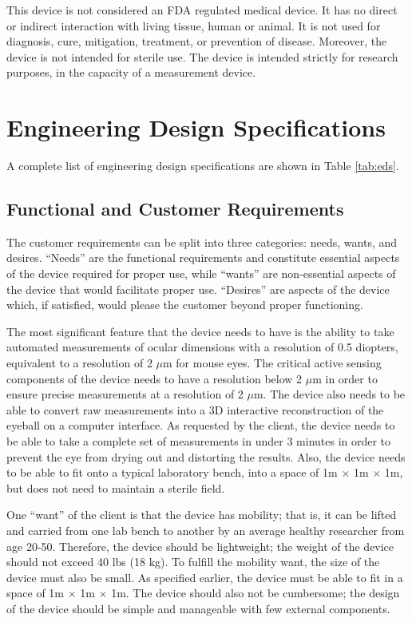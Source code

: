 \documentclass{article}
\begin{document}
This device is not considered an FDA regulated medical device. It has
no direct or indirect interaction with living tissue, human or
animal. It is not used for diagnosis, cure, mitigation, treatment, or
prevention of disease. Moreover, the device is not intended for
sterile use. The device is intended strictly for research
purposes, in the capacity of a measurement device.

\section{Engineering Design Specifications}
A complete list of engineering design specifications are shown in Table \ref{tab:eds}.

\subsection{Functional and Customer Requirements}
The customer requirements can be split into three categories: needs, wants, and desires. ``Needs'' are the functional requirements and constitute essential aspects of the device required for proper use, while ``wants'' are non‐essential aspects of the device that would facilitate proper use. ``Desires'' are aspects of the device which, if satisfied, would please the customer beyond proper functioning.  

The most significant feature that the device needs to have is the
ability to take automated measurements of ocular dimensions with a
resolution of 0.5 diopters, equivalent to a resolution of 2 $\mu$m for
mouse eyes. The critical active sensing components of the device needs
to have a resolution below 2 $\mu$m in order to ensure precise
measurements at a resolution of 2 $\mu$m. The device also needs to be
able to convert raw measurements into a 3D interactive reconstruction
of the eyeball on a computer interface. As requested by the client,
the device needs to be able to take a complete set of measurements in
under 3 minutes in order to prevent the eye from drying out and
distorting the results. Also, the device needs to be able to fit onto
a typical laboratory bench, into a space of 1m $\times$ 1m $\times$
1m, but does not need to maintain a sterile field.

One ``want'' of the client is that the device has mobility; that is,
it can be lifted and carried from one lab bench to another by an
average healthy researcher from age 20‐50. Therefore, the device
should be lightweight; the weight of the device should not exceed 40
lbs (18 kg).\cite{gross03} To fulfill the mobility want, the size of
the device must also be small. As specified earlier, the device must
be able to fit in a space of 1m $\times$ 1m $\times$ 1m. The device
should also not be cumbersome; the design of the device should be
simple and manageable with few external components.
\end{document}
